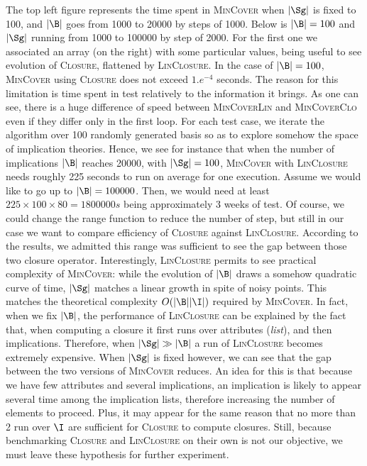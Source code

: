 \begin{figure}[H]
	
\end{figure}

\vspace{1.2em}

The top left figure represents the time spent in \textsc{MinCover} when $|\Sg|$ is fixed to 100, and $|\B|$ goes from 1000 to 20000 by steps of 1000. Below is $|\B| = 100$ and $|\Sg|$ running from 1000 to 100000 by step of 2000. For the first one we associated an array (on the right) with some particular values, being useful to see evolution of \textsc{Closure}, flattened by \textsc{LinClosure}. In the case of $|\B| = 100$, \textsc{MinCover} using \textsc{Closure} does not exceed $1.e^{-4}$ seconds. The reason for this limitation is time spent in test relatively to the information it brings. As one can see, there is a huge difference of speed between \textsc{MinCoverLin} and \textsc{MinCoverClo} even if they differ only in the first loop. For each test case, we iterate the algorithm over 100 randomly generated basis so as to explore somehow the space of implication theories. Hence, we see for instance that when the number of implications $|\B|$ reaches 20000, with $|\Sg| = 100$, \textsc{MinCover} with \textsc{LinClosure} needs roughly 225 seconds to run on average for one execution. Assume we would like to go up to $|\B| = 100000$. Then, we would need at least $225 \times 100 \times 80 = 1800000s$ being approximately 3 weeks of test. Of course, we could change the range function to reduce the number of step, but still in our case we want to compare efficiency of \textsc{Closure} against \textsc{LinClosure}. According to the results, we admitted this range was sufficient to see the gap between those two closure operator. Interestingly, \textsc{LinClosure} permits to see practical complexity of \textsc{MinCover}: while the evolution of $|\B|$ draws a somehow quadratic curve of time, $|\Sg|$ matches a linear growth in spite of noisy points. This matches the theoretical complexity $O(|\B||\I|)$ required by \textsc{MinCover}. In fact, when we fix $|\B|$, the performance of \textsc{LinClosure} can be explained by the fact that, when computing a closure it first runs over attributes (\textit{list}), and then implications. Therefore, when $|\Sg| \gg |\B|$ a run of \textsc{LinClosure} becomes extremely expensive. When $|\Sg|$ is fixed however, we can see that the gap between the two versions of \textsc{MinCover} reduces. An idea for this is that because we have few attributes and several implications, an implication is likely to appear several time among the implication lists, therefore increasing the number
of elements to proceed. Plus, it may appear for the same reason that no more than 2 run over $\I$ are sufficient for \textsc{Closure} to compute closures. 
Still, because benchmarking \textsc{Closure} and \textsc{LinClosure} on their own is not our objective, we must leave these hypothesis for further experiment.


